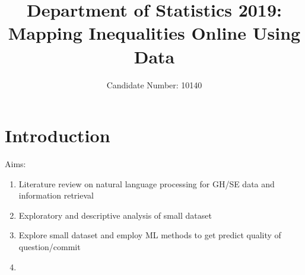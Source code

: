 \documentclass[11pt,preprint, authoryear]{article}
\title{Department of Statistics 2019: Mapping Inequalities Online Using Data}
\author{Candidate Number: 10140}
\date{}
\numberwithin{equation}{section}
\numberwithin{figure}{section}
\numberwithin{table}{section}
\begin{document}
\pagestyle{fancy}
\chead{}
\rhead{}
\lfoot{}
\rfoot{} 
\lhead{}
\cfoot{\footnotesize \thepage\\}





\maketitle
\thispagestyle{empty}



\clearpage

\setcounter{page}{1}

\renewcommand{\contentsname}{Contents}
\hypersetup{linkcolor=black}
\tableofcontents
\newpage
\hypersetup{linkcolor=black}
\listoftables
\newpage
\hypersetup{linkcolor=black}
\listoffigures
\hypersetup{linkcolor=black}
\newpage


\renewcommand{\vec}[1]{\mathbf{#1}}


\section{\texorpdfstring{Introduction
\label{Intro}}{Introduction }}\label{introduction}

Aims:

\begin{enumerate}
\def\labelenumi{\arabic{enumi}.}
\item
  Literature review on natural language processing for GH/SE data and
  information retrieval
\item
  Exploratory and descriptive analysis of small dataset
\item
  Explore small dataset and employ ML methods to get predict quality of
  question/commit
\item
\end{enumerate}
\end{document}
